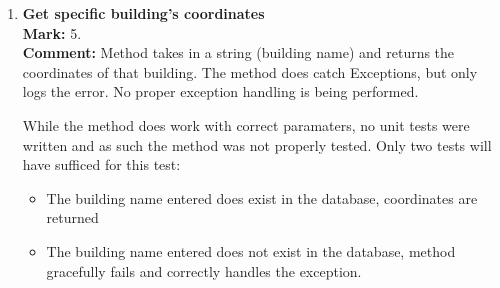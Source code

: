 \documentclass[12pt]{article}
\begin{document}
\begin{enumerate}
		\item \textbf {Get specific building's coordinates}\\
		\textbf{Mark: }
		5.\\
		\textbf{Comment: }
		Method takes in a string (building name) and returns the coordinates of that building.
		The method does catch Exceptions, but only logs the error. No proper exception handling is being performed.
		
		While the method does work with correct paramaters, no unit tests were written and as such the method was not properly tested.
		Only two tests will have sufficed for this test:  
		\begin{itemize}
			\item The building name entered does exist in the database, coordinates are returned
			\item The building name entered does not exist in the database, method gracefully fails and correctly handles the exception.
		\end{itemize}	
	\end{enumerate}
\end{document}
